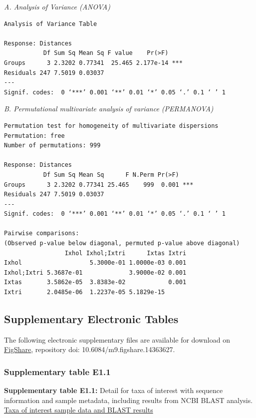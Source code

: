 \documentclass[a4paper, nobind]{templates/ociamthesis}
\begin{document}
\emph{A. Analysis of Variance (ANOVA)}

\begin{verbatim}
Analysis of Variance Table

Response: Distances
           Df Sum Sq Mean Sq F value    Pr(>F)    
Groups      3 2.3202 0.77341  25.465 2.177e-14 ***
Residuals 247 7.5019 0.03037                      
---
Signif. codes:  0 ‘***’ 0.001 ‘**’ 0.01 ‘*’ 0.05 ‘.’ 0.1 ‘ ’ 1
\end{verbatim}

\emph{B. Permutational multivariate analysis of variance (PERMANOVA)}

\begin{verbatim}
Permutation test for homogeneity of multivariate dispersions
Permutation: free
Number of permutations: 999

Response: Distances
           Df Sum Sq Mean Sq      F N.Perm Pr(>F)    
Groups      3 2.3202 0.77341 25.465    999  0.001 ***
Residuals 247 7.5019 0.03037                         
---
Signif. codes:  0 ‘***’ 0.001 ‘**’ 0.01 ‘*’ 0.05 ‘.’ 0.1 ‘ ’ 1

Pairwise comparisons:
(Observed p-value below diagonal, permuted p-value above diagonal)
                 Ixhol Ixhol;Ixtri      Ixtas Ixtri
Ixhol                   5.3000e-01 1.0000e-03 0.001
Ixhol;Ixtri 5.3687e-01             3.9000e-02 0.001
Ixtas       3.5862e-05  3.8383e-02            0.001
Ixtri       2.0485e-06  1.2237e-05 5.1829e-15     
\end{verbatim}

\clearpage

\hypertarget{ch3-esupp}{%
\subsection{Supplementary Electronic Tables}\label{ch3-esupp}}

The following electronic supplementary files are available for download on \href{https://figshare.com/s/0f5495957bce881caef8}{FigShare}, repository doi: 10.6084/m9.figshare.14363627.

\hypertarget{supplementary-table-e1.1}{%
\subsubsection{Supplementary table E1.1}\label{supplementary-table-e1.1}}

\textbf{Supplementary table E1.1:} Detail for taxa of interest with sequence information and sample metadata, including results from NCBI BLAST analysis.
\href{https://ndownloader.figshare.com/files/27452714}{Taxa of interest sample data and BLAST results}
\end{document}
